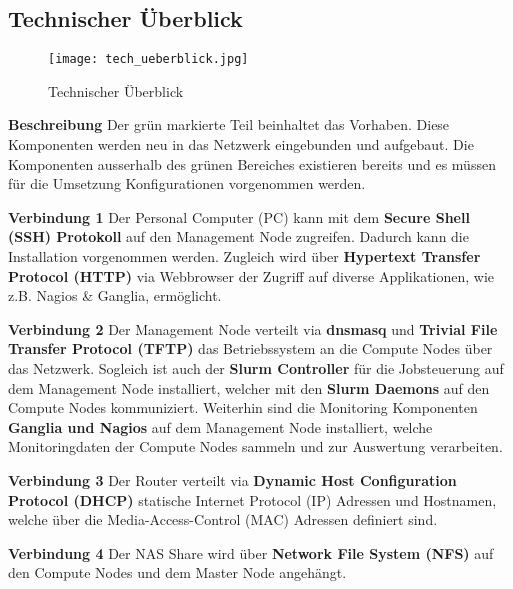 \subsection{Technischer Überblick}
\begin{figure}[H]
\centering
\texttt{[image: tech\_ueberblick.jpg]}
\caption{Technischer Überblick}
\label{fig:Technischer Überblick}
\end{figure} 

\textbf{Beschreibung}\newline
Der grün markierte Teil beinhaltet das Vorhaben. Diese Komponenten werden neu in das Netzwerk eingebunden und aufgebaut. Die Komponenten ausserhalb des grünen Bereiches existieren bereits und es müssen für die Umsetzung Konfigurationen vorgenommen werden.

\textbf{Verbindung 1} \newline
Der Personal Computer (PC) kann mit dem \textbf{Secure Shell (SSH) Protokoll} auf den Management Node zugreifen. Dadurch kann die Installation vorgenommen werden. Zugleich wird über \textbf{Hypertext Transfer Protocol (HTTP)} via Webbrowser der Zugriff auf diverse Applikationen, wie z.B. Nagios \& Ganglia, ermöglicht.

\textbf{Verbindung 2} \newline
Der Management Node verteilt via \textbf{dnsmasq} und  \textbf {Trivial File Transfer Protocol (TFTP)} das Betriebssystem an die Compute Nodes über das Netzwerk. Sogleich ist auch der \textbf{Slurm Controller} für die Jobsteuerung auf dem Management Node installiert, welcher mit den \textbf{Slurm Daemons} auf den Compute Nodes kommuniziert. Weiterhin sind die Monitoring Komponenten \textbf{Ganglia und Nagios} auf dem Management Node installiert, welche Monitoringdaten der Compute Nodes sammeln und zur Auswertung verarbeiten.

\textbf{Verbindung 3} \newline
Der Router verteilt via \textbf{Dynamic Host Configuration Protocol (DHCP)} statische Internet Protocol (IP) Adressen und Hostnamen, welche über die Media-Access-Control (MAC) Adressen definiert sind.

\textbf{Verbindung 4} \newline
Der NAS Share wird über \textbf{Network File System (NFS)} auf den Compute Nodes und dem Master Node angehängt.

